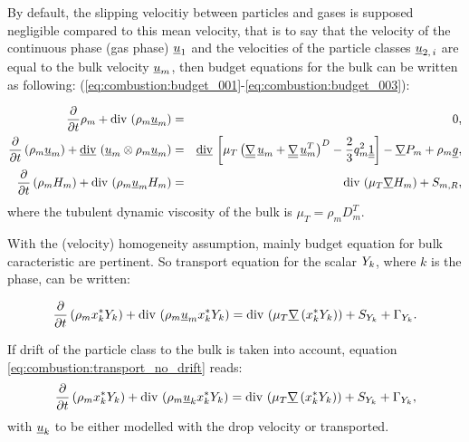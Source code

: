 By default, the slipping velocitiy between particles
and gases is supposed negligible compared to this mean velocity, that is to say that the velocity of
the continuous phase (gas phase) $\underline{u}_1$ and the velocities of the particle classes
$\underline{u}_{2, \, i}$ are equal to the bulk velocity $\underline{u}_m$, then
budget equations for the bulk can be written as following:
(\ref{eq:combustion:budget_001}-\ref{eq:combustion:budget_003}):

\begin{eqnarray}
\dfrac{\partial }{\partial t} \rho_{m}
+\text{div}\, \left( \rho_{m} \underline{u}_{m} \right) & = & 0 ,  \label{eq:combustion:budget_001} \\
\dfrac{\partial }{\partial t} \left( \rho_{m} \underline{u}_{m} \right)
+\underline{\text{div}}\, \left( \underline{u}_{m}\otimes \rho_m \underline{u}_{m} \right)
& = &  \underline{\text{div}}\, \left[
\mu_T \left( \underline{\underline{{\nabla}}} \, \underline{u}_m + \underline{\underline{{\nabla}}} \, \underline{u}_m^T \right)^D - \dfrac{2}{3} q_m^2\underline{\underline{1}}
\right]
-\underline{\nabla} P_{m} + \rho_{m} \underline{g} ,  \label{eq:combustion:budget_002} \\
\dfrac{\partial }{\partial t} \left( \rho_{m} H_{m} \right)
+\text{div}\, \left( \rho_{m} \underline{u}_{m}H_{m} \right)
& = & \text{div}\, \left( \mu_T \underline{\nabla} H_{m} \right) + S_{m,R} , \label{eq:combustion:budget_003}
\end{eqnarray}
where the tubulent dynamic viscosity of the bulk is $\mu_T =  \rho_m D_m^T$.

With the (velocity) homogeneity assumption, mainly budget equation for bulk
caracteristic are pertinent. So transport equation for the scalar $Y_{k}$,
where $k$ is the phase, can be written:

\begin{equation}\label{eq:combustion:transport_no_drift}
  \dfrac{\partial }{\partial t} \left( \rho_{m} x_{k}^{*}Y_{k} \right)
 +\text{div}\, \left( \rho_{m} \underline{u}_{m} x_{k}^{*} Y_{k} \right)
              = \text{div}\, \left( \mu_T \underline{\nabla} \left( x_{k}^{*} Y_{k} \right) \right)
               +S_{Y_{k}}+\Gamma_{Y_{k}}.
\end{equation}

If drift of the particle class to the bulk is taken into account, equation \eqref{eq:combustion:transport_no_drift}
reads:
\begin{equation}\label{eq:combustion:transport_drift}
  \dfrac{\partial }{\partial t} \left( \rho_{m} x_{k}^{*}Y_{k} \right)
 +\text{div}\, \left( \rho_{m} \underline{u}_{k} x_{k}^{*} Y_{k} \right)
              = \text{div}\, \left( \mu_T \underline{\nabla} \left( x_{k}^{*} Y_{k} \right) \right)
               +S_{Y_{k}}+\Gamma_{Y_{k}},
\end{equation}
with $\underline{u}_{k}$ to be either modelled with the drop velocity or transported.


